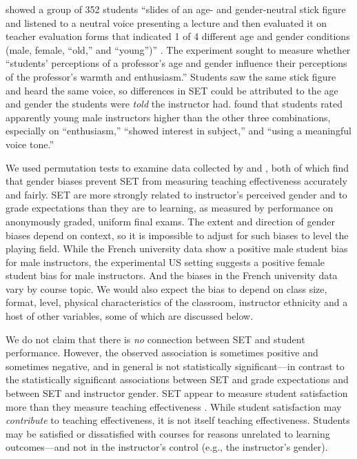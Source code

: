 \documentclass[12pt]{article}
\begin{document}
\citet{Arbuckle2003} showed a group of 352 students 
``slides of an age- and gender-neutral stick figure and listened to a neutral voice 
presenting a lecture and then evaluated it on teacher evaluation forms that indicated 
1 of 4 different age and gender conditions 
(male, female, ``old,'' and ``young'')'' \citealp[p.507]{Arbuckle2003}. 
The experiment sought to measure whether 
``students' perceptions of a professor's age and gender influence their perceptions of the 
professor's warmth and enthusiasm.'' 
Students saw the same stick figure and heard the same voice, so differences in SET 
could be attributed to the age and gender the students were \emph{told} the instructor had.
\citet{Arbuckle2003} found that students rated apparently young male instructors higher 
than the other three combinations, especially on ``enthusiasm,'' ``showed interest in subject,'' 
and ``using a meaningful voice tone.'' 

We used permutation tests to examine data collected  by
\citet{Boring2015} and \citet{MacNell2014}, both of which find that gender biases prevent 
SET from measuring teaching effectiveness accurately and fairly. 
SET are more strongly related to instructor's perceived gender and to grade expectations 
than they are to learning, 
as measured by performance on anonymously graded, uniform final exams. 
The extent and direction of gender biases depend on context, so it is
impossible to adjust for such biases to level the playing field.
While the French university data show a positive male student bias for male instructors, 
the experimental US setting suggests a positive female student bias for male instructors.
And the biases in the French university data vary by course topic.
We would also expect the bias to depend on class size, format, level, physical characteristics
of the classroom, instructor ethnicity and a host of other variables, some of which
are discussed below.

We do not claim that there is \emph{no} connection between SET and student
performance.
However, the observed association is sometimes positive and sometimes
negative, and in general is not statistically significant---in contrast to
the statistically significant associations between SET and grade expectations and 
between SET and instructor gender.
SET appear to measure student satisfaction more than they measure teaching 
effectiveness \citep{StarkFreishtat2014}. 
While student satisfaction may \emph{contribute} to teaching effectiveness, it is not 
itself teaching effectiveness.
Students may be satisfied or dissatisfied with courses for reasons unrelated to 
learning outcomes---and not in the instructor's control (e.g., the instructor's gender).
\end{document}
